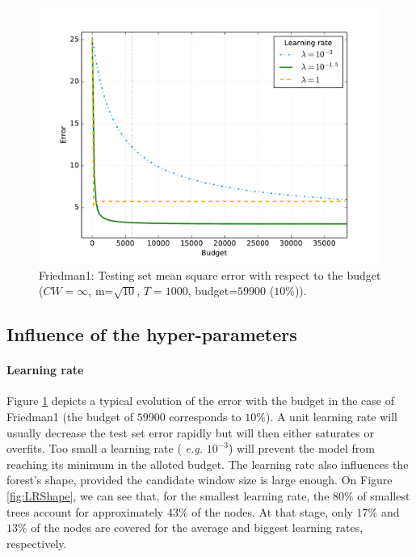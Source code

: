 \documentclass{article}
\begin{document}
\begin{figure}[ht]
\begin{center}
\centerline{\includegraphics[width=\columnwidth]{friedman1_lr}}
\caption{Friedman1: Testing set mean square error with respect to the budget 
($CW=\infty$, m=$\sqrt{10}$, $T=1000$, budget=$59900$ ($10\%$)).}
\label{fig:learningRate}
\end{center}
\vskip -0.2in
\end{figure} 

\subsection{Influence of the hyper-parameters}
\label{subsec:hyperparams}


\paragraph{Learning rate}
Figure \ref{fig:learningRate} depicts a typical evolution of the error with the 
budget in the case of Friedman1 (the budget of $59900$ corresponds to $10\%$). 
A unit learning rate will usually decrease the test set error rapidly 
but will then either saturates or overfits. Too small a learning rate ({\it 
e.g.} $10^{-3}$) will prevent the model from reaching its minimum in the 
alloted budget.  The learning rate also influences the forest's shape, provided 
the candidate window size is large enough. On Figure \ref{fig:LRShape}, we can 
see that, for the smallest learning rate, the $80\%$ of smallest trees 
account for approximately $43\%$ of the nodes. At that stage, only $17\%$ and 
$13\%$ of the nodes are covered for the average and biggest learning rates, 
respectively. 
\end{document}
